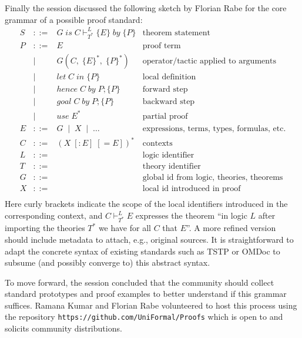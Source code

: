 \documentclass{article}
\begin{document}
Finally the session discussed the following sketch by Florian Rabe for the core grammar of a possible proof standard:
\[
\begin{array}{lcll}
S       &::=& G\;is\;C\vdash^L_{T^*} \{E\} \; by\; \{P\} & \text{theorem statement}\\
P       &::=& E & \text{proof term}\\
        &|&   G (C,\; \{E\}^*,\; \{P\}^*) & \text{operator/tactic applied to arguments}\\
        &|&   let\; C\; in\; \{P\} & \text{local definition}\\
        &|&   hence\;C\; by\; P; \{P\} & \text{forward step} \\
        &|&   goal\; C \;by\; P; \{P\} & \text{backward step}\\
        &|&   use\; E^* & \text{partial proof}\\
E       &::=& G\;\;|\;\; X \;\;|\;\;\ldots & \text{expressions, terms, types, formulas, etc.}\\
C       &::=& (X\;[:E]\;[=E])^* & \text{contexts}\\
L       &::=&  & \text{logic identifier} \\
T       &::=&  & \text{theory identifier}\\
G       &::=&  & \text{global id from logic, theories, theorems} \\
X       &::=&  & \text{local id introduced in proof}\\
\end{array}
\]
Here curly brackets indicate the scope of the local identifiers introduced in the corresponding context, and $C\vdash^L_{T^*} E$ expresses the theorem ``in logic $L$ after importing the theories $T^*$ we have for all $C$ that $E$''.
A more refined version should include metadata to attach, e.g., original sources.
It is straightforward to adapt the concrete syntax of existing standards such as TSTP or OMDoc to subsume (and possibly converge to) this abstract syntax.

To move forward, the session concluded that the community should collect standard prototypes and proof examples to better understand if this grammar suffices.
Ramana Kumar and Florian Rabe volunteered to host this process using the repository \verb|https://github.com/UniFormal/Proofs| which is open to and solicits community distributions.
\end{document}
